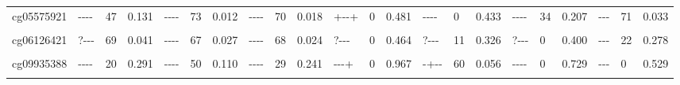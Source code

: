 \documentclass[11pt,oneside]{bristolthesis}
\begin{document}
\begin{landscape}
\begin{table}[!h]
{\begin{tabular}[t]{llllllllllllllllllllll}
cg05575921 & {-}{-}{-}{-} & 47 & 0.131 & {-}{-}{-}{-} & 73 & 0.012 & {-}{-}{-}{-} & 70 & 0.018 & {+}{-}{-}{+} & 0 & 0.481 & {-}{-}{-}{-} & 0 & 0.433 & {-}{-}{-}{-} & 34 & 0.207 & {-}{-}{-} & 71 & 0.033\\
\cellcolor{gray!6}{cg05951221} & \cellcolor{gray!6}{{-}{-}{-}{-}} & \cellcolor{gray!6}{45} & \cellcolor{gray!6}{0.139} & \cellcolor{gray!6}{{-}{-}{-}{-}} & \cellcolor{gray!6}{61} & \cellcolor{gray!6}{0.053} & \cellcolor{gray!6}{{-}{-}{-}{-}} & \cellcolor{gray!6}{54} & \cellcolor{gray!6}{0.092} & \cellcolor{gray!6}{{-}{-}{+}{+}} & \cellcolor{gray!6}{0} & \cellcolor{gray!6}{0.862} & \cellcolor{gray!6}{{-}{-}{-}{-}} & \cellcolor{gray!6}{33} & \cellcolor{gray!6}{0.217} & \cellcolor{gray!6}{{-}{-}{-}{-}} & \cellcolor{gray!6}{15} & \cellcolor{gray!6}{0.315} & \cellcolor{gray!6}{{-}{-}{-}} & \cellcolor{gray!6}{44} & \cellcolor{gray!6}{0.168}\\
\addlinespace
cg06126421 & {?}{-}{-}{-} & 69 & 0.041 & {-}{-}{-}{-} & 67 & 0.027 & {-}{-}{-}{-} & 68 & 0.024 & {?}{-}{-}{-} & 0 & 0.464 & {?}{-}{-}{-} & 11 & 0.326 & {?}{-}{-}{-} & 0 & 0.400 & {-}{-}{-} & 22 & 0.278\\
\cellcolor{gray!6}{cg08709672} & \cellcolor{gray!6}{{-}{-}{-}{-}} & \cellcolor{gray!6}{12} & \cellcolor{gray!6}{0.333} & \cellcolor{gray!6}{{-}{-}{-}{-}} & \cellcolor{gray!6}{52} & \cellcolor{gray!6}{0.101} & \cellcolor{gray!6}{{-}{-}{-}{-}} & \cellcolor{gray!6}{57} & \cellcolor{gray!6}{0.071} & \cellcolor{gray!6}{{-}{-}{+}{+}} & \cellcolor{gray!6}{55} & \cellcolor{gray!6}{0.085} & \cellcolor{gray!6}{{-}{-}{-}{+}} & \cellcolor{gray!6}{0} & \cellcolor{gray!6}{0.584} & \cellcolor{gray!6}{{-}{-}{-}{+}} & \cellcolor{gray!6}{0} & \cellcolor{gray!6}{0.735} & \cellcolor{gray!6}{{-}{-}{-}} & \cellcolor{gray!6}{0} & \cellcolor{gray!6}{0.657}\\
cg09935388 & {-}{-}{-}{-} & 20 & 0.291 & {-}{-}{-}{-} & 50 & 0.110 & {-}{-}{-}{-} & 29 & 0.241 & {-}{-}{-}{+} & 0 & 0.967 & {-}{+}{-}{-} & 60 & 0.056 & {-}{-}{-}{-} & 0 & 0.729 & {-}{-}{-} & 0 & 0.529\\
\cellcolor{gray!6}{cg11660018} & \cellcolor{gray!6}{{-}{-}{-}{-}} & \cellcolor{gray!6}{0} & \cellcolor{gray!6}{0.476} & \cellcolor{gray!6}{{-}{-}{-}{-}} & \cellcolor{gray!6}{7} & \cellcolor{gray!6}{0.358} & \cellcolor{gray!6}{{-}{-}{-}{-}} & \cellcolor{gray!6}{0} & \cellcolor{gray!6}{0.455} & \cellcolor{gray!6}{{+}{-}{+}{+}} & \cellcolor{gray!6}{0} & \cellcolor{gray!6}{0.699} & \cellcolor{gray!6}{{-}{-}{-}{-}} & \cellcolor{gray!6}{9} & \cellcolor{gray!6}{0.349} & \cellcolor{gray!6}{{-}{-}{-}{-}} & \cellcolor{gray!6}{0} & \cellcolor{gray!6}{0.557} & \cellcolor{gray!6}{{-}{-}{-}} & \cellcolor{gray!6}{16} & \cellcolor{gray!6}{0.305}\\

\end{tabular}}
\end{table}
\end{landscape}
\end{document}
